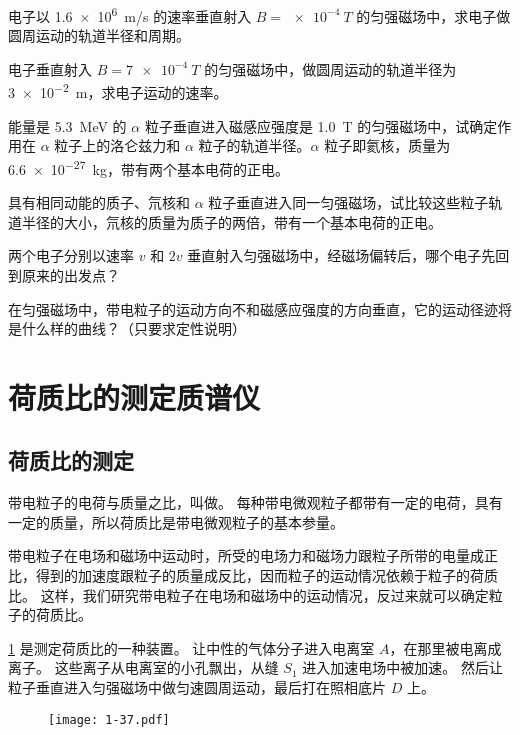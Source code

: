 \begin{Practice}
\begin{question}
    \item 电子以 \qty{1.6e6}{m/s} 的速率垂直射入 $B=\qty{e-4}{T}$ 的匀强磁场中，求电子做圆周运动的轨道半径和周期。
    \item 电子垂直射入 $B=\qty{7e-4}{T}$ 的匀强磁场中，做圆周运动的轨道半径为 \qty{3e-2}{m}，求电子运动的速率。
    \item 能量是 \qty{5.3}{\mega eV} 的 $\alpha$ 粒子垂直进入磁感应强度是 \qty{1.0}{T} 的匀强磁场中，试确定作用在 $\alpha$ 粒子上的洛仑兹力和 $\alpha$ 粒子的轨道半径。$\alpha$ 粒子即氦核，质量为 \qty{6.6e-27}{kg}，带有两个基本电荷的正电。
    \item 具有相同动能的质子、氘核和 $\alpha$ 粒子垂直进入同一匀强磁场，试比较这些粒子轨道半径的大小，氘核的质量为质子的两倍，带有一个基本电荷的正电。
    \item 两个电子分别以速率 $v$ 和 $2v$ 垂直射入匀强磁场中，经磁场偏转后，哪个电子先回到原来的出发点？
    \item 在匀强磁场中，带电粒子的运动方向不和磁感应强度的方向垂直，它的运动径迹将是什么样的曲线？（只要求定性说明）
\end{question}
\end{Practice}


\section{荷质比的测定\texorpdfstring{\quad}{ }质谱仪}
\subsection{荷质比的测定}
带电粒子的电荷与质量之比，叫做。
每种带电微观粒子都带有一定的电荷，具有一定的质量，所以荷质比是带电微观粒子的基本参量。

带电粒子在电场和磁场中运动时，所受的电场力和磁场力跟粒子所带的电量成正比，得到的加速度跟粒子的质量成反比，因而粒子的运动情况依赖于粒子的荷质比。
这样，我们研究带电粒子在电场和磁场中的运动情况，反过来就可以确定粒子的荷质比。

\cref{fig:1-37} 是测定荷质比的一种装置。
让中性的气体分子进入电离室 $A$，在那里被电离成离子。
这些离子从电离室的小孔飘出，从缝 $S_1$ 进入加速电场中被加速。
然后让粒子垂直进入匀强磁场中做匀速圆周运动，最后打在照相底片 $D$ 上。
\begin{figure}
  \texttt{[image: 1-37.pdf]}
  \caption{}\label{fig:1-37}
\end{figure}

